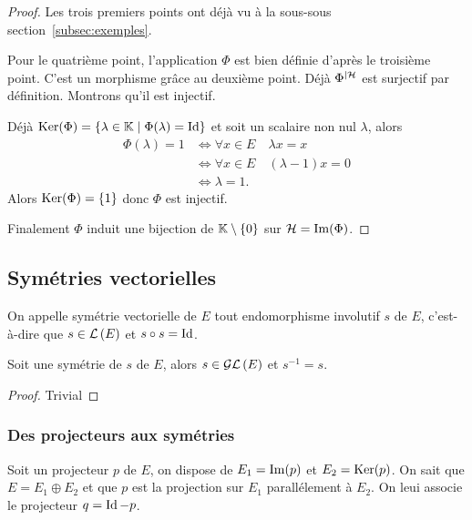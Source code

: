 \begin{proof}
  Les trois premiers points ont déjà vu à la sous-sous section~\ref{subsec:exemples}.

  Pour le quatrième point, l'application \(\Phi\) est bien définie d'après le troisième point. C'est un morphisme grâce au deuxième point. Déjà \(\Phi^{|\mathcal{H}}\) est surjectif par définition. Montrons qu'il est injectif.

Déjà \(\operatorname{Ker}(\Phi)=\left\{\lambda \in \mathbb{K}\mathrel{}\middle|\mathrel{}\Phi(\lambda)=\operatorname{Id}\right\}\) et soit un scalaire non nul \(\lambda\), alors
\begin{align}
  \Phi(\lambda) = 1 &\iff \forall x \in E \quad \lambda x=x\\
  &\iff \forall x \in E \quad (\lambda-1)x=0\\
  &\iff \lambda=1.
\end{align}
Alors  \(\operatorname{Ker}(\Phi)=\{1\}\) donc \(\Phi\) est injectif.

Finalement \(\Phi\) induit une bijection de \(\mathbb{K}\setminus\{0\}\) sur \(\mathcal{H}=\operatorname{Im}(\Phi)\).
\end{proof}

\subsection{Symétries vectorielles}

\begin{defdef}
  On appelle symétrie vectorielle de \(E\) tout endomorphisme involutif \(s\) de \(E\), c'est-à-dire que \(s \in \mathcal{L}\left(E\right)\) et \(s \circ s = \operatorname{Id}\).
\end{defdef}

\begin{prop}
  Soit une symétrie de \(s\) de \(E\), alors \(s \in \mathcal{GL}\left(E\right)\) et \(s^{-1}=s\).
\end{prop}
\begin{proof}
  Trivial
\end{proof}

\subsubsection{Des projecteurs aux symétries}

Soit un projecteur \(p\) de \(E\), on dispose de \(E_1=\operatorname{Im}(p)\) et \(E_2=\operatorname{Ker}(p)\). On sait que \(E=E_1 \oplus E_2\) et que \(p\) est la projection sur \(E_1\) parallélement à \(E_2\). On leui associe le projecteur \(q=\operatorname{Id}-p\).

